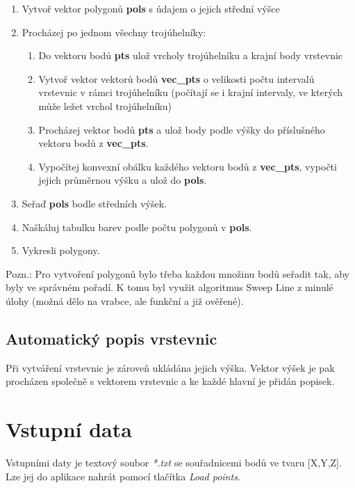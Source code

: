 \documentclass[a4paper, 12pt]{article}
\begin{document}
\begin{enumerate}
	\item Vytvoř vektor polygonů \textbf{pols} s údajem o jejich střední výšce
	\item Procházej po jednom všechny trojúhelníky:
		\begin{enumerate}
			\item Do vektoru bodů \textbf{pts} ulož vrcholy trojúhelníku a krajní body vrstevnic
			\item Vytvoř vektor vektorů bodů \textbf{vec\_pts} o velikosti počtu intervalů vrstevnic v rámci trojúhelníku (počítají se i krajní intervaly, ve kterých může ležet vrchol trojúhelníku)
			\item Procházej vektor bodů \textbf{pts} a ulož body podle výšky do příslušného vektoru bodů z \textbf{vec\_pts}.
			\item Vypočítej konvexní obálku každého vektoru bodů z \textbf{vec\_pts}, vypočti jejich průměrnou výšku a ulož do \textbf{pols}. 
		\end{enumerate}
	\item Seřaď \textbf{pols} bodle středních výšek.
	\item Naškáluj tabulku barev podle počtu polygonů v \textbf{pols}.
	\item Vykresli polygony.
\end{enumerate}

Pozn.: Pro vytvoření polygonů bylo třeba každou množinu bodů seřadit tak, aby byly ve správném pořadí. K tomu byl využit algoritmus Sweep Line z minulé úlohy (možná dělo na vrabce, ale funkční a již ověřené).

\subsection{Automatický popis vrstevnic}
Při vytváření vrstevnic je zároveň ukládána jejich výška. Vektor výšek je pak procházen společně s vektorem vrstevnic a ke každé hlavní je přidán popisek.

\clearpage


\section{Vstupní data}

Vstupními daty je textový soubor \textit{*.txt} se souřadnicemi bodů ve tvaru [X,Y,Z]. Lze jej do aplikace nahrát pomocí tlačítka \textit{Load points}.\\
\end{document}
